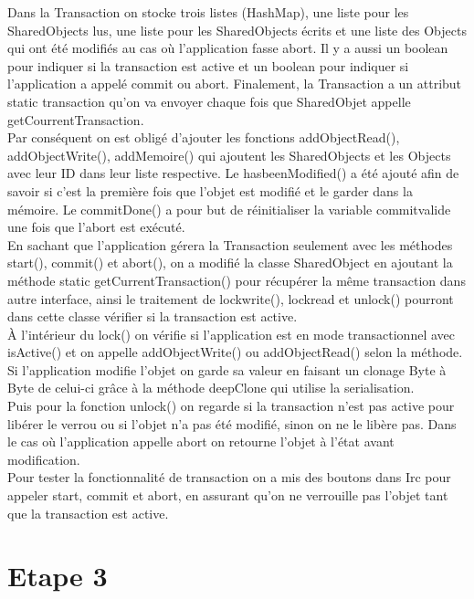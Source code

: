 \documentclass[a4paper,12pt]{article}
\begin{document}
Dans la Transaction on stocke trois listes (HashMap), une liste pour les SharedObjects lus, une liste pour les SharedObjects écrits et une liste des Objects qui ont été modifiés au cas où l’application fasse abort. Il y a aussi un boolean pour indiquer si la transaction est active et un boolean pour indiquer si l’application a appelé commit ou abort. Finalement, la Transaction a un attribut static transaction qu'on va envoyer chaque fois que SharedObjet appelle getCourrentTransaction. \\

Par conséquent on est obligé d'ajouter les fonctions addObjectRead(), addObjectWrite(), addMemoire() qui ajoutent les SharedObjects et les Objects avec leur ID dans leur liste respective. Le hasbeenModified() a été ajouté afin de savoir si c’est la première fois que l’objet est modifié et le garder dans la mémoire. Le commitDone() a pour but de réinitialiser la variable commitvalide une fois que l’abort est exécuté. \\

En sachant que l’application gérera la Transaction seulement avec les méthodes start(), commit() et abort(), on a modifié la classe SharedObject en ajoutant la méthode static getCurrentTransaction() pour récupérer la même transaction dans autre interface, ainsi le traitement de lockwrite(), lockread et unlock() pourront dans cette classe vérifier si la transaction est active.\\

À l’intérieur du lock() on vérifie si l’application est en mode transactionnel avec isActive() et  on appelle addObjectWrite() ou addObjectRead() selon la méthode. Si l’application modifie l’objet on garde sa valeur en faisant un clonage Byte à Byte de celui-ci grâce à la méthode deepClone qui utilise la serialisation. \\

Puis pour la fonction unlock() on regarde si la transaction n’est pas active pour libérer le verrou ou si l’objet n’a pas été modifié, sinon on ne le libère pas. Dans le cas où l’application appelle abort on retourne l’objet à l’état avant modification.\\

Pour tester la fonctionnalité de transaction on a mis des boutons dans Irc pour appeler start, commit et abort, en assurant qu’on ne verrouille pas l’objet tant que la transaction est active. 

\clearpage
\section{Etape 3}
\end{document}
